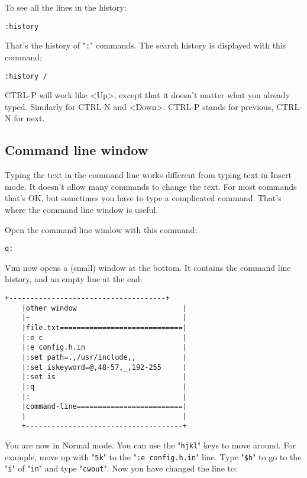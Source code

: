 To see all the lines in the history:

\begin{Verbatim}[samepage=true]
 :history
\end{Verbatim}

That's the history of "\verb!:!" commands.
The search history is displayed with this command:

\begin{Verbatim}[samepage=true]
 :history /
\end{Verbatim}

CTRL-P will work like <Up>, except that it doesn't matter what you already typed.
Similarly for CTRL-N and <Down>.
CTRL-P stands for previous, CTRL-N for next.
\subsection{Command line window}
Typing the text in the command line works different from typing text in Insert mode.
It doesn't allow many commands to change the text.
For most commands that's OK, but sometimes you have to type a complicated command.
That's where the command line window is useful.

Open the command line window with this command:

\begin{Verbatim}[samepage=true]
 q:
\end{Verbatim}

Vim now opens a (small) window at the bottom.
It contains the command line history, and an empty line at the end:

\begin{Verbatim}[samepage=true]
    +-------------------------------------+
    |other window                         |
    |~                                    |
    |file.txt=============================|
    |:e c                                 |
    |:e config.h.in                       |
    |:set path=.,/usr/include,,           |
    |:set iskeyword=@,48-57,_,192-255     |
    |:set is                              |
    |:q                                   |
    |:                                    |
    |command-line=========================|
    |                                     |
    +-------------------------------------+
\end{Verbatim}

You are now in Normal mode.
You can use the "\verb!hjkl!" keys to move around.
For example, move up with "\verb!5k!" to the "\verb!:e config.h.in!" line.
Type "\verb!$h!" to go to the "\verb!i!" of "\verb!in!" and type "\verb!cwout!".
Now you have changed the line to:

